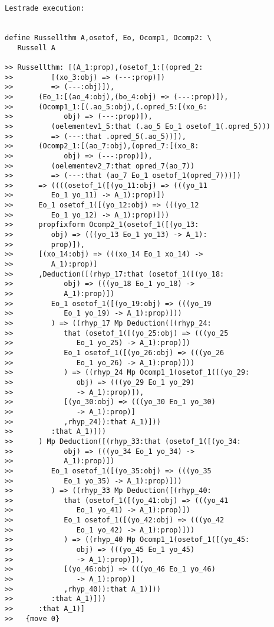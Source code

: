 \documentclass[12pt]{article}
\begin{document}
\begin{verbatim}Lestrade execution:


define Russellthm A,osetof, Eo, Ocomp1, Ocomp2: \
   Russell A

>> Russellthm: [(A_1:prop),(osetof_1:[(opred_2:
>>         [(xo_3:obj) => (---:prop)])
>>         => (---:obj)]),
>>      (Eo_1:[(ao_4:obj),(bo_4:obj) => (---:prop)]),
>>      (Ocomp1_1:[(.ao_5:obj),(.opred_5:[(xo_6:
>>            obj) => (---:prop)]),
>>         (oelementev1_5:that (.ao_5 Eo_1 osetof_1(.opred_5)))
>>         => (---:that .opred_5(.ao_5))]),
>>      (Ocomp2_1:[(ao_7:obj),(opred_7:[(xo_8:
>>            obj) => (---:prop)]),
>>         (oelementev2_7:that opred_7(ao_7))
>>         => (---:that (ao_7 Eo_1 osetof_1(opred_7)))])
>>      => ((((osetof_1([(yo_11:obj) => (((yo_11
>>         Eo_1 yo_11) -> A_1):prop)])
>>      Eo_1 osetof_1([(yo_12:obj) => (((yo_12
>>         Eo_1 yo_12) -> A_1):prop)]))
>>      propfixform Ocomp2_1(osetof_1([(yo_13:
>>         obj) => (((yo_13 Eo_1 yo_13) -> A_1):
>>         prop)]),
>>      [(xo_14:obj) => (((xo_14 Eo_1 xo_14) ->
>>         A_1):prop)]
>>      ,Deduction([(rhyp_17:that (osetof_1([(yo_18:
>>            obj) => (((yo_18 Eo_1 yo_18) ->
>>            A_1):prop)])
>>         Eo_1 osetof_1([(yo_19:obj) => (((yo_19
>>            Eo_1 yo_19) -> A_1):prop)]))
>>         ) => ((rhyp_17 Mp Deduction([(rhyp_24:
>>            that (osetof_1([(yo_25:obj) => (((yo_25
>>               Eo_1 yo_25) -> A_1):prop)])
>>            Eo_1 osetof_1([(yo_26:obj) => (((yo_26
>>               Eo_1 yo_26) -> A_1):prop)]))
>>            ) => ((rhyp_24 Mp Ocomp1_1(osetof_1([(yo_29:
>>               obj) => (((yo_29 Eo_1 yo_29)
>>               -> A_1):prop)]),
>>            [(yo_30:obj) => (((yo_30 Eo_1 yo_30)
>>               -> A_1):prop)]
>>            ,rhyp_24)):that A_1)]))
>>         :that A_1)]))
>>      ) Mp Deduction([(rhyp_33:that (osetof_1([(yo_34:
>>            obj) => (((yo_34 Eo_1 yo_34) ->
>>            A_1):prop)])
>>         Eo_1 osetof_1([(yo_35:obj) => (((yo_35
>>            Eo_1 yo_35) -> A_1):prop)]))
>>         ) => ((rhyp_33 Mp Deduction([(rhyp_40:
>>            that (osetof_1([(yo_41:obj) => (((yo_41
>>               Eo_1 yo_41) -> A_1):prop)])
>>            Eo_1 osetof_1([(yo_42:obj) => (((yo_42
>>               Eo_1 yo_42) -> A_1):prop)]))
>>            ) => ((rhyp_40 Mp Ocomp1_1(osetof_1([(yo_45:
>>               obj) => (((yo_45 Eo_1 yo_45)
>>               -> A_1):prop)]),
>>            [(yo_46:obj) => (((yo_46 Eo_1 yo_46)
>>               -> A_1):prop)]
>>            ,rhyp_40)):that A_1)]))
>>         :that A_1)]))
>>      :that A_1)]
>>   {move 0}


\end{verbatim}
\end{document}
